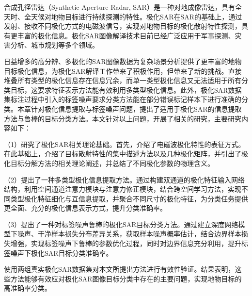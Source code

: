 \begin{chineseabstract}
  合成孔径雷达（Synthetic Aperture Radar, SAR）是一种对地成像雷达，具有全天时、全天候对地物目标进行持续探测的特性。极化SAR在SAR的基础上，通过发射、接收不同极化方式的电磁波信号，实现对地物目标的极化散射特性探测，具有更丰富的极化信息。极化SAR图像解译技术目前已经广泛应用于军事探测、灾害分析、城市规划等多个领域。

  日益增多的高分辨、多极化的SAR图像数据为复杂场景分析提供了更丰富的地物目标极化信息，为极化SAR解译工作带来了积极作用，但带来了新的挑战。直接堆叠所有类型的极化信息存在信息冗余，而单一类型极化信息又无法适用于所有分类目标，这要求特征表示方法能有效利用多类型极化信息。此外，极化SAR数据集标注过程中引入的标签噪声要求分类方法能在部分错误标记样本下进行准确的分类。本章针对极化信息提取与标签噪声问题，提出了适用于极化SAR的信息提取方法与鲁棒的目标分类方法。本文针对以上问题，开展了相关的研究，主要研究内容如下：

  （1）研究了极化SAR相关理论基础。首先，介绍了电磁波极化特性的表征方式。在此基础上，介绍了目标散射特性的集中描述方法以及几种极化矩阵，并引出了极化目标分解方法的相关理论阐述，并总结了不同极化参数的物理含义。

  （2）提出了一种多类型极化信息提取方法。通过构建双通道的极化特征输入网络结构，利用空间通道注意力模块与注意力修正模块，结合跨空间学习方法，实现不同类型极化特征细化与互信息提取，并聚合不同尺寸的极化特征，为分类任务提供更全面、充分的极化信息表示方式，提升分类准确率。

  （3）提出了一种对标签噪声鲁棒的极化SAR目标分类方法。通过建立深度网络模型下噪声、干净样本损失分布差异关系，获取样本噪声概率估计，结合边界样本损失增强，实现标签噪声下鲁棒的参数优化过程，同时对边界信息充分利用，提升标签噪声下极化SAR目标分类准确率。

  使用两组真实极化SAR数据集对本文所提出方法进行有效性验证。结果表明，这些方法能够有效应对极化SAR图像目标分类中存在的主要问题，实现地物目标的高准确率分类。


\end{chineseabstract}